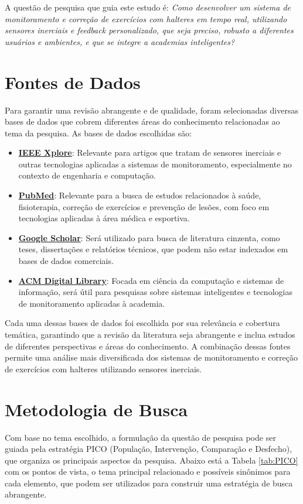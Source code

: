 \documentclass[conference]{IEEEtran}
\begin{document}
A questão de pesquisa que guia este estudo é: \textit{Como desenvolver um sistema de monitoramento e correção de exercícios com halteres em tempo real, utilizando sensores inerciais e feedback personalizado, que seja preciso, robusto a diferentes usuários e ambientes, e que se integre a academias inteligentes?}

\section{Fontes de Dados}
\label{sec:fontes}

Para garantir uma revisão abrangente e de qualidade, foram selecionadas diversas bases de dados que cobrem diferentes áreas do conhecimento relacionadas ao tema da pesquisa. As bases de dados escolhidas são:

\begin{itemize}
    \item \textbf{\href{https://ieeexplore.ieee.org/search/advanced}{IEEE Xplore}}: Relevante para artigos que tratam de sensores inerciais e outras tecnologias aplicadas a sistemas de monitoramento, especialmente no contexto de engenharia e computação.
    \item \textbf{\href{https://pubmed.ncbi.nlm.nih.gov/advanced/}{PubMed}}: Relevante para a busca de estudos relacionados à saúde, fisioterapia, correção de exercícios e prevenção de lesões, com foco em tecnologias aplicadas à área médica e esportiva.
    \item \textbf{\href{https://scholar.google.com/}{Google Scholar}}: Será utilizado para busca de literatura cinzenta, como teses, dissertações e relatórios técnicos, que podem não estar indexados em bases de dados comerciais.
    \item \textbf{\href{https://dl.acm.org/search/advanced}{ACM Digital Library}}: Focada em ciência da computação e sistemas de informação, será útil para pesquisas sobre sistemas inteligentes e tecnologias de monitoramento aplicadas à academia.
\end{itemize}

Cada uma dessas bases de dados foi escolhida por sua relevância e cobertura temática, garantindo que a revisão da literatura seja abrangente e inclua estudos de diferentes perspectivas e áreas do conhecimento. A combinação dessas fontes permite uma análise mais diversificada dos sistemas de monitoramento e correção de exercícios com halteres utilizando sensores inerciais.

\section{Metodologia de Busca}
\label{sec:metodologia}
Com base no tema escolhido, a formulação da questão de pesquisa pode ser guiada pela estratégia PICO (População, Intervenção, Comparação e Desfecho), que organiza os principais aspectos da pesquisa. Abaixo está a Tabela \ref{tab:PICO} com os pontos de vista, o tema principal relacionado e possíveis sinônimos para cada elemento, que podem ser utilizados para construir uma estratégia de busca abrangente.
\end{document}
